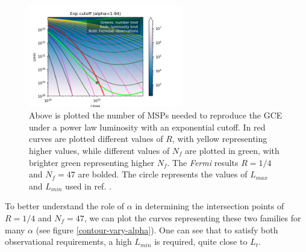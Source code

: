 \documentclass{C://Aliases//Dropbox-MIT//Latex_Templates//personal}
\begin{document}
\begin{figure}[h]
    \centering
    \includegraphics[width=0.6\textwidth]{../../luminosity-models/power-law/step-sensitivity/contour-overlay-extra.png}
    \caption{Above is plotted the number of MSPs needed to reproduce the GCE under a power law luminosity with an exponential cutoff. In red curves are plotted different values of $R$, with yellow representing higher values, while different values of $N_f$ are plotted in green, with brighter green representing higher $N_f$. The \textit{Fermi} results $R=1/4$ and $N_f=47$ are bolded. The circle represents the values of $L_{max}$ and $L_{min}$ used in ref. \cite{fermilab}.}
    \label{contour-overlay-extra-power-law}
\end{figure}

To better understand the role of $\alpha$ in determining the intersection points of $R=1/4$ and $N_f = 47$, we can plot the curves representing these two families for many $\alpha$ (see figure \ref{contour-vary-alpha}). One can see that to satisfy both observational requirements, a high $L_{min}$ is required, quite close to $L_t$.
\end{document}
